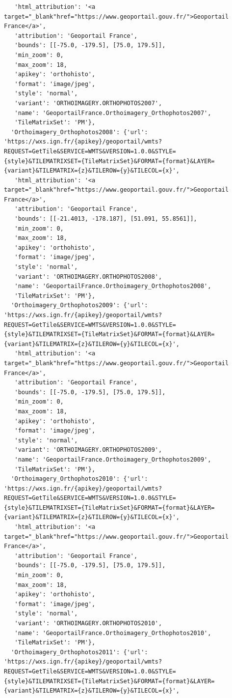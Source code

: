 \documentclass[
  letterpaper,
  DIV=11,
  numbers=noendperiod]{scrreprt}
\begin{document}
\begin{verbatim}
   'html_attribution': '<a target="_blank"href="https://www.geoportail.gouv.fr/">Geoportail France</a>',
   'attribution': 'Geoportail France',
   'bounds': [[-75.0, -179.5], [75.0, 179.5]],
   'min_zoom': 0,
   'max_zoom': 18,
   'apikey': 'orthohisto',
   'format': 'image/jpeg',
   'style': 'normal',
   'variant': 'ORTHOIMAGERY.ORTHOPHOTOS2007',
   'name': 'GeoportailFrance.Orthoimagery_Orthophotos2007',
   'TileMatrixSet': 'PM'},
  'Orthoimagery_Orthophotos2008': {'url': 'https://wxs.ign.fr/{apikey}/geoportail/wmts?REQUEST=GetTile&SERVICE=WMTS&VERSION=1.0.0&STYLE={style}&TILEMATRIXSET={TileMatrixSet}&FORMAT={format}&LAYER={variant}&TILEMATRIX={z}&TILEROW={y}&TILECOL={x}',
   'html_attribution': '<a target="_blank"href="https://www.geoportail.gouv.fr/">Geoportail France</a>',
   'attribution': 'Geoportail France',
   'bounds': [[-21.4013, -178.187], [51.091, 55.8561]],
   'min_zoom': 0,
   'max_zoom': 18,
   'apikey': 'orthohisto',
   'format': 'image/jpeg',
   'style': 'normal',
   'variant': 'ORTHOIMAGERY.ORTHOPHOTOS2008',
   'name': 'GeoportailFrance.Orthoimagery_Orthophotos2008',
   'TileMatrixSet': 'PM'},
  'Orthoimagery_Orthophotos2009': {'url': 'https://wxs.ign.fr/{apikey}/geoportail/wmts?REQUEST=GetTile&SERVICE=WMTS&VERSION=1.0.0&STYLE={style}&TILEMATRIXSET={TileMatrixSet}&FORMAT={format}&LAYER={variant}&TILEMATRIX={z}&TILEROW={y}&TILECOL={x}',
   'html_attribution': '<a target="_blank"href="https://www.geoportail.gouv.fr/">Geoportail France</a>',
   'attribution': 'Geoportail France',
   'bounds': [[-75.0, -179.5], [75.0, 179.5]],
   'min_zoom': 0,
   'max_zoom': 18,
   'apikey': 'orthohisto',
   'format': 'image/jpeg',
   'style': 'normal',
   'variant': 'ORTHOIMAGERY.ORTHOPHOTOS2009',
   'name': 'GeoportailFrance.Orthoimagery_Orthophotos2009',
   'TileMatrixSet': 'PM'},
  'Orthoimagery_Orthophotos2010': {'url': 'https://wxs.ign.fr/{apikey}/geoportail/wmts?REQUEST=GetTile&SERVICE=WMTS&VERSION=1.0.0&STYLE={style}&TILEMATRIXSET={TileMatrixSet}&FORMAT={format}&LAYER={variant}&TILEMATRIX={z}&TILEROW={y}&TILECOL={x}',
   'html_attribution': '<a target="_blank"href="https://www.geoportail.gouv.fr/">Geoportail France</a>',
   'attribution': 'Geoportail France',
   'bounds': [[-75.0, -179.5], [75.0, 179.5]],
   'min_zoom': 0,
   'max_zoom': 18,
   'apikey': 'orthohisto',
   'format': 'image/jpeg',
   'style': 'normal',
   'variant': 'ORTHOIMAGERY.ORTHOPHOTOS2010',
   'name': 'GeoportailFrance.Orthoimagery_Orthophotos2010',
   'TileMatrixSet': 'PM'},
  'Orthoimagery_Orthophotos2011': {'url': 'https://wxs.ign.fr/{apikey}/geoportail/wmts?REQUEST=GetTile&SERVICE=WMTS&VERSION=1.0.0&STYLE={style}&TILEMATRIXSET={TileMatrixSet}&FORMAT={format}&LAYER={variant}&TILEMATRIX={z}&TILEROW={y}&TILECOL={x}',

\end{verbatim}
\end{document}
